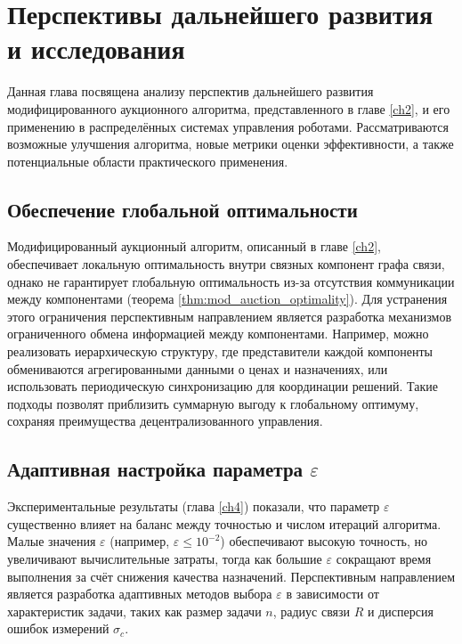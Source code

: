 \chapter{Перспективы дальнейшего развития и исследования}
\label{ch5}

Данная глава посвящена анализу перспектив дальнейшего развития модифицированного аукционного алгоритма, представленного в главе \ref{ch2}, и его применению в распределённых системах управления роботами. Рассматриваются возможные улучшения алгоритма, новые метрики оценки эффективности, а также потенциальные области практического применения.

\section{Обеспечение глобальной оптимальности}
Модифицированный аукционный алгоритм, описанный в главе \ref{ch2}, обеспечивает локальную оптимальность внутри связных компонент графа связи, однако не гарантирует глобальную оптимальность из-за отсутствия коммуникации между компонентами (теорема \ref{thm:mod_auction_optimality}). Для устранения этого ограничения перспективным направлением является разработка механизмов ограниченного обмена информацией между компонентами. Например, можно реализовать иерархическую структуру, где представители каждой компоненты обмениваются агрегированными данными о ценах и назначениях, или использовать периодическую синхронизацию для координации решений. Такие подходы позволят приблизить суммарную выгоду к глобальному оптимуму, сохраняя преимущества децентрализованного управления.

\section{Адаптивная настройка параметра $\varepsilon$}
Экспериментальные результаты (глава \ref{ch4}) показали, что параметр $\varepsilon$ существенно влияет на баланс между точностью и числом итераций алгоритма. Малые значения $\varepsilon$ (например, $\varepsilon \leqslant 10^{-2}$) обеспечивают высокую точность, но увеличивают вычислительные затраты, тогда как большие $\varepsilon$ сокращают время выполнения за счёт снижения качества назначений. Перспективным направлением является разработка адаптивных методов выбора $\varepsilon$ в зависимости от характеристик задачи, таких как размер задачи $n$, радиус связи $R$ и дисперсия ошибок измерений $\sigma_c$. 

